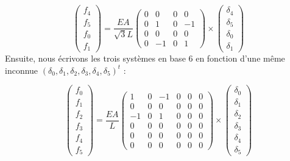 \documentclass[a4paper]{article}
\begin{document}
\[\left(\begin{array}{r}f_4\\ f_5\\f_0\\f_1 \end{array}\right) 
=\frac{EA}{\sqrt 3L}\left(\begin{array}{rrrr} 
0&0&0&0\\
0&1&0&-1\\
0&0&0&0\\
0&-1&0&1
\end{array}\right)\times
\left(\begin{array}{r} \delta_4\\ \delta_5\\\delta_0\\\delta_1  \end{array}\right) 
\]
Ensuite, nous écrivons les trois systèmes en base 6 en fonction d'une même inconnue $(\delta_0,\delta_1,\delta_2,\delta_3,\delta_4,\delta_5)^t$ :

\[\left(\begin{array}{r}f_0\\ f_1\\f_2\\f_3\\f_4\\f_5 \end{array}\right) 
=\frac{EA}{L}
\left(\begin{array}{rrrrcc} 
1&0&-1&0&0&0\\
0&0&0&0&0&0\\
-1&0&1&0&0&0\\
0&0&0&0&0&0\\
0&0&0&0&0&0\\
0&0&0&0&0&0
\end{array}\right)\times
\left(\begin{array}{r} \delta_0\\ \delta_1\\ \delta_2\\ \delta_3\\ \delta_4\\ \delta_5  \end{array}\right) 
\]
\end{document}
